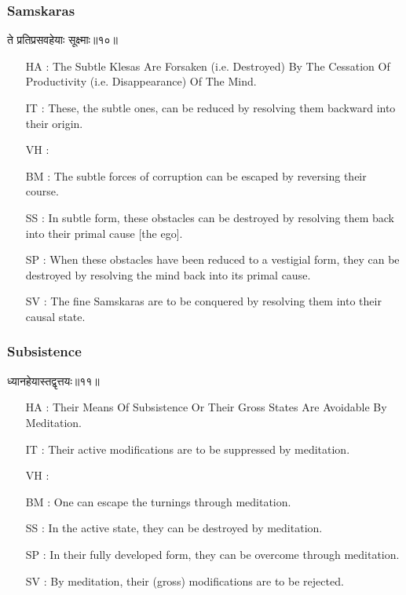 \begin{frame}[fragile]\frametitle{Samskaras}
\begin{sanskrit}
ते प्रतिप्रसवहेयाः सूक्ष्माः॥१०॥
\end{sanskrit}

	\begin{itemize}
	\item [HA]: The Subtle Klesas Are Forsaken (i.e. Destroyed) By The Cessation Of Productivity (i.e. Disappearance) Of The Mind.
	\item [IT]: These, the subtle ones, can be reduced by resolving them backward into their origin.
	\item [VH]: 
	\item [BM]: The subtle forces of corruption can be escaped by reversing their course.
	\item [SS]: In subtle form, these obstacles can be destroyed by resolving them back into their primal cause [the ego].
	\item [SP]: When these obstacles have been reduced to a vestigial form, they can be destroyed by resolving the mind back into its primal cause.
	\item [SV]: The fine Samskaras are to be conquered by resolving them into their causal state. 
	\end{itemize}
\end{frame}


\begin{frame}[fragile]\frametitle{Subsistence}
\begin{sanskrit}
ध्यानहेयास्तद्वृत्तयः॥११॥
\end{sanskrit}

	\begin{itemize}
	\item [HA]: Their Means Of Subsistence Or Their Gross States Are Avoidable By Meditation.
	\item [IT]: Their active modifications are to be suppressed by meditation.
	\item [VH]: 
	\item [BM]: One can escape the turnings through meditation.
	\item [SS]: In the active state, they can be destroyed by meditation.
	\item [SP]: In their fully developed form, they can be overcome through meditation.
	\item [SV]: By meditation, their (gross) modifications are to be rejected. 
	\end{itemize}
\end{frame}


